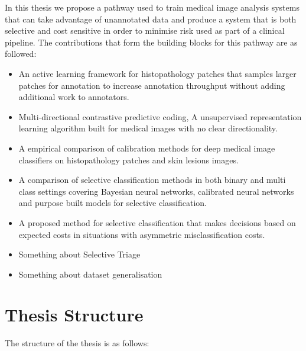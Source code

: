 In this thesis we propose a pathway used to train medical image analysis systems that can take advantage of unannotated data and produce a system that is both selective and cost sensitive in order to minimise risk used as part of a clinical pipeline. The contributions that form the building blocks for this pathway are as followed:

\begin{itemize}
	\item An active learning framework for histopathology patches that samples larger patches for annotation to increase annotation throughput without adding additional work to annotators.
	
	\item Multi-directional contrastive predictive coding, A unsupervised representation learning algorithm built for medical images with no clear directionality.

	\item A empirical comparison of calibration methods for deep medical image classifiers on histopathology patches and skin lesions images.
	
	\item A comparison of selective classification methods in both binary and multi class settings covering Bayesian neural networks, calibrated neural networks and purpose built models for selective classification.
	
	\item A proposed method for selective classification that makes decisions based on expected costs in situations with asymmetric misclassification costs.
	
	\item Something about Selective Triage
	
	\item Something about dataset generalisation
\end{itemize}



\section{Thesis Structure}
\label{sec:thesis_structure}
The structure of the thesis is as follows:

